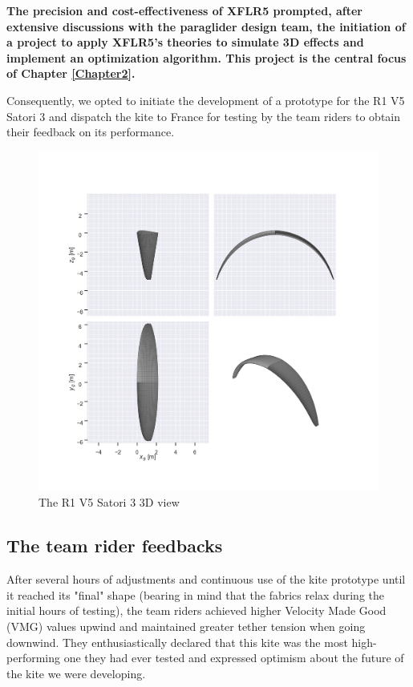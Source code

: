 \textbf{The precision and cost-effectiveness of XFLR5 prompted, after extensive discussions with the paraglider design team, the initiation of a project to apply XFLR5's theories to simulate 3D effects and implement an optimization algorithm. This project is the central focus of Chapter \ref{Chapter2}.}

Consequently, we opted to initiate the development of a prototype for the R1 V5 Satori 3 and dispatch the kite to France for testing by the team riders to obtain their feedback on its performance.

\begin{figure}[H]
    \centering
    \includegraphics[width=1\linewidth]{figures/2D steady simulations/results/R1 V5 Satori 3 3D view.png}
    \caption{The R1 V5 Satori 3 3D view}
    \label{fig:The R1 V5 Satori 3 3D view}
\end{figure}


\subsection{The team rider feedbacks}
\label{sub:Ch1.6.4}

After several hours of adjustments and continuous use of the kite prototype until it reached its "final" shape (bearing in mind that the fabrics relax during the initial hours of testing), the team riders achieved higher Velocity Made Good (VMG) values upwind and maintained greater tether tension when going downwind. They enthusiastically declared that this kite was the most high-performing one they had ever tested and expressed optimism about the future of the kite we were developing.

